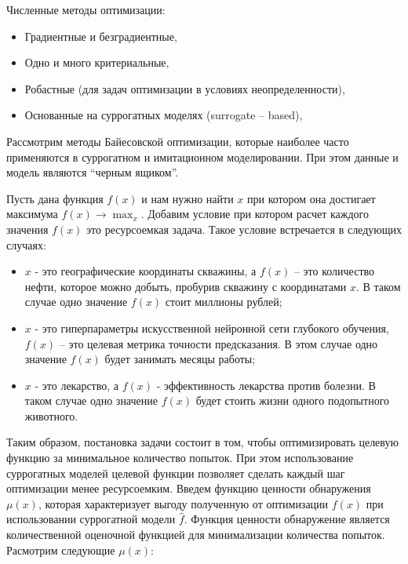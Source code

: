 Численные методы оптимизации:

\begin{itemize}
\tightlist
\item  Градиентные и безградиентные, 
\item  Одно и много критериальные, 
\item  Робастные (для задач оптимизации в условиях неопределенности), 
\item  Основанные на суррогатных моделях (surrogate -- based),
\end{itemize}

Рассмотрим методы Байесовской оптимизации, которые наиболее часто применяются в суррогатном и имитационном моделировании. 
При этом данные и модель являются ``черным ящиком''.

Пусть дана функция  $ f \left(  x \right)$  и нам нужно найти $x$ при котором она достигает максимума  $ f \left(  x \right) \longrightarrow \max_x$. Добавим условие при котором расчет каждого значения  $ f \left(  x \right)$ это ресурсоемкая задача. Такое условие встречается в следующих случаях: 

\begin{itemize}
\item $x$ - это географические координаты скважины, а  $ f \left(  x \right)$ -- это количество нефти, которое можно добыть, пробурив скважину с координатами $x$. В таком случае одно значение  $ f \left(  x \right)$ стоит миллионы рублей;
\item $x$ - это гиперпараметры искусственной нейронной сети глубокого обучения,  $ f \left(  x \right)$  -- это целевая метрика точности предсказания. В этом случае одно значение  $ f \left(  x \right)$ будет занимать месяцы работы;
\item $x$ - это лекарство, а  $ f \left(  x \right)$ - эффективность лекарства против болезни. В таком случае одно значение  $ f \left(  x \right)$ будет стоить жизни одного подопытного животного.
\end{itemize}

Таким образом, постановка задачи состоит в том, чтобы оптимизировать целевую функцию за минимальное количество попыток.
При этом использование суррогатных моделей целевой функции позволяет сделать каждый шаг оптимизации менее ресурсоемким. 
Введем функцию ценности обнаружения  $ \mu \left(  x \right)$, которая характеризует выгоду полученную от оптимизации  $ f \left(  x \right)$ при использовании суррогатной модели $\hat{f}$.
Функция ценности обнаружение является количественной оценочной функцией для минимализации количества попыток. 
Расмотрим следующие  $ \mu \left(  x \right)$:

